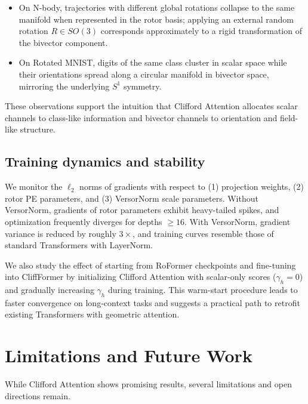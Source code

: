\documentclass{article}
\theoremstyle{plain}
\theoremstyle{definition}
\theoremstyle{remark}
\begin{document}
\begin{itemize}
    \item On N-body, trajectories with different global rotations collapse to the same manifold when represented in the rotor basis; applying an external random rotation $R \in SO(3)$ corresponds approximately to a rigid transformation of the bivector component.
    \item On Rotated MNIST, digits of the same class cluster in scalar space while their orientations spread along a circular manifold in bivector space, mirroring the underlying $S^1$ symmetry.
\end{itemize}

These observations support the intuition that Clifford Attention allocates scalar channels to class-like information and bivector channels to orientation and field-like structure.

\subsection{Training dynamics and stability}

We monitor the $\ell_2$ norms of gradients with respect to (1) projection weights, (2) rotor PE parameters, and (3) VersorNorm scale parameters. Without VersorNorm, gradients of rotor parameters exhibit heavy-tailed spikes, and optimization frequently diverges for depths $\geq 16$. With VersorNorm, gradient variance is reduced by roughly $3\times$, and training curves resemble those of standard Transformers with LayerNorm.

We also study the effect of starting from RoFormer checkpoints and fine-tuning into CliffFormer by initializing Clifford Attention with scalar-only scores ($\gamma_h=0$) and gradually increasing $\gamma_h$ during training. This warm-start procedure leads to faster convergence on long-context tasks and suggests a practical path to retrofit existing Transformers with geometric attention.

\section{Limitations and Future Work}
\label{sec:limitations}

While Clifford Attention shows promising results, several limitations and open directions remain.
\end{document}
